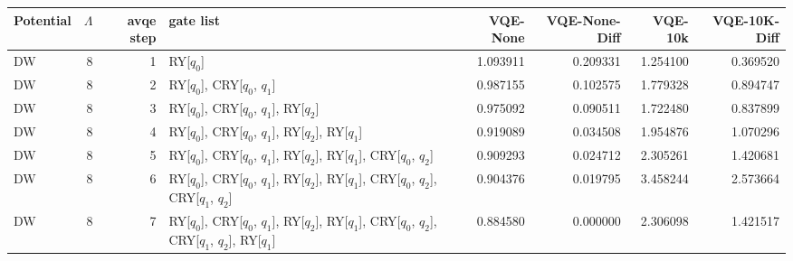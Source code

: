\begin{tabular}{lrrlrrrr}
\toprule
Potential & $\Lambda$ & avqe step & gate list & VQE-None & VQE-None-Diff & VQE-10k & VQE-10K-Diff \\
\midrule
DW & 8 & 1 & RY[$q_0$] & 1.093911 & 0.209331 & 1.254100 & 0.369520 \\
DW & 8 & 2 & RY[$q_0$], CRY[$q_0$, $q_1$] & 0.987155 & 0.102575 & 1.779328 & 0.894747 \\
DW & 8 & 3 & RY[$q_0$], CRY[$q_0$, $q_1$], RY[$q_2$] & 0.975092 & 0.090511 & 1.722480 & 0.837899 \\
DW & 8 & 4 & RY[$q_0$], CRY[$q_0$, $q_1$], RY[$q_2$], RY[$q_1$] & 0.919089 & 0.034508 & 1.954876 & 1.070296 \\
DW & 8 & 5 & RY[$q_0$], CRY[$q_0$, $q_1$], RY[$q_2$], RY[$q_1$], CRY[$q_0$, $q_2$] & 0.909293 & 0.024712 & 2.305261 & 1.420681 \\
DW & 8 & 6 & RY[$q_0$], CRY[$q_0$, $q_1$], RY[$q_2$], RY[$q_1$], CRY[$q_0$, $q_2$], CRY[$q_1$, $q_2$] & 0.904376 & 0.019795 & 3.458244 & 2.573664 \\
DW & 8 & 7 & RY[$q_0$], CRY[$q_0$, $q_1$], RY[$q_2$], RY[$q_1$], CRY[$q_0$, $q_2$], CRY[$q_1$, $q_2$], RY[$q_1$] & 0.884580 & 0.000000 & 2.306098 & 1.421517 \\
\bottomrule
\end{tabular}

